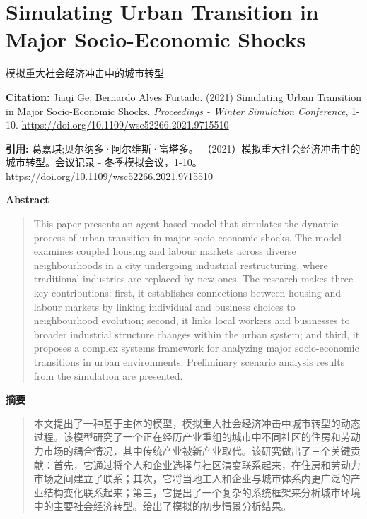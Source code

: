 \vspace{0.5em}


\chapter{Simulating Urban Transition in Major Socio-Economic Shocks}
\begin{center}\small 模拟重大社会经济冲击中的城市转型\end{center}

\noindent\textbf{Citation:} Jiaqi Ge; Bernardo Alves Furtado. (2021) Simulating Urban Transition in Major Socio-Economic Shocks. \textit{Proceedings - Winter Simulation Conference}, 1-10. \url{https://doi.org/10.1109/wsc52266.2021.9715510}

\vspace{0.5em}
\noindent\textbf{引用:} 葛嘉琪;贝尔纳多·阿尔维斯·富塔多。 （2021）模拟重大社会经济冲击中的城市转型。会议记录 - 冬季模拟会议，1-10。 https://doi.org/10.1109/wsc52266.2021.9715510

\vspace{1.5em}
\noindent\textbf{Abstract}\par
\begin{quote}\small
This paper presents an agent-based model that simulates the dynamic process of urban transition in major socio-economic shocks. The model examines coupled housing and labour markets across diverse neighbourhoods in a city undergoing industrial restructuring, where traditional industries are replaced by new ones. The research makes three key contributions: first, it establishes connections between housing and labour markets by linking individual and business choices to neighbourhood evolution; second, it links local workers and businesses to broader industrial structure changes within the urban system; and third, it proposes a complex systems framework for analyzing major socio-economic transitions in urban environments. Preliminary scenario analysis results from the simulation are presented.
\end{quote}

\noindent\textbf{摘要}\par
\begin{quote}\small
本文提出了一种基于主体的模型，模拟重大社会经济冲击中城市转型的动态过程。该模型研究了一个正在经历产业重组的城市中不同社区的住房和劳动力市场的耦合情况，其中传统产业被新产业取代。该研究做出了三个关键贡献：首先，它通过将个人和企业选择与社区演变联系起来，在住房和劳动力市场之间建立了联系；其次，它将当地工人和企业与城市体系内更广泛的产业结构变化联系起来；第三，它提出了一个复杂的系统框架来分析城市环境中的主要社会经济转型。给出了模拟的初步情景分析结果。
\end{quote}

